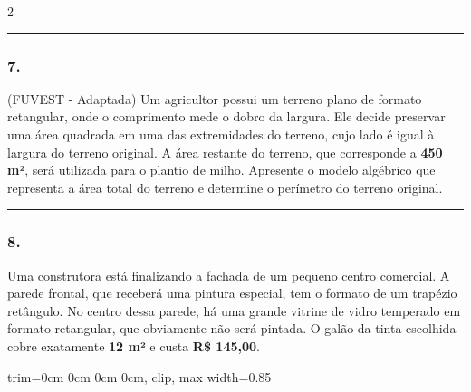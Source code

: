 \documentclass[twoside, 10pt, a4paper]{article}
\newlength{\espacoPreQuestao}\setlength{\espacoPreQuestao}{0.1cm}
\newlength{\espacoQuestao}\setlength{\espacoQuestao}{0.2cm}
\newcommand{\larguraTikz}{0.85\linewidth}
\begin{document}
\begin{multicols*}{2}
\noindent\textcolor{CorLinha}{\rule{\linewidth}{0.5pt}} 
\par\vspace{\espacoPreQuestao}
\subsubsection*{7.} (FUVEST - Adaptada) Um agricultor possui um terreno plano de formato retangular, onde o comprimento mede o dobro da largura. Ele decide preservar uma área quadrada em uma das extremidades do terreno, cujo lado é igual à largura do terreno original. A área restante do terreno, que corresponde a \textbf{450 m²}, será utilizada para o plantio de milho. Apresente o modelo algébrico que representa a área total do terreno e determine o perímetro do terreno original.
\par\vspace{\espacoQuestao}

\noindent\textcolor{CorLinha}{\rule{\linewidth}{0.5pt}} 
\par\vspace{\espacoPreQuestao}
\subsubsection*{8.} Uma construtora está finalizando a fachada de um pequeno centro comercial. A parede frontal, que receberá uma pintura especial, tem o formato de um trapézio retângulo. No centro dessa parede, há uma grande vitrine de vidro temperado em formato retangular, que obviamente não será pintada. O galão da tinta escolhida cobre exatamente \textbf{12 m²} e custa \textbf{R\$ 145,00}.

\begin{center}
\begin{adjustbox}{trim=0cm 0cm 0cm 0cm, clip, max width=\larguraTikz}
\end{adjustbox}
\end{center}
\end{multicols*}
\end{document}
